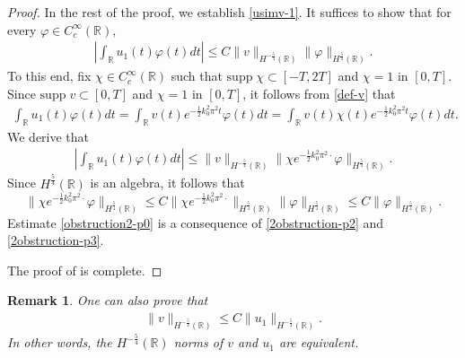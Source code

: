 \documentclass[11pt, reqno]{amsart}
\theoremstyle{plain}
\newtheorem{remark}{Remark}
\numberwithin{equation}{section}
\newcommand{\be}{\begin{equation}}
\newcommand{\ee}{\end{equation}}
\newcommand{\mR}{\mathbb{R}}
\begin{document}
\begin{proof}
In the rest of the proof,  we establish \eqref{usimv-1}. It suffices to show that for every $\varphi \in C_c^\infty(\mR)$,
\begin{align} \label{obstruction2-p0}
	\left| \int_{\mR} u_1(t) \varphi(t) dt \right| \leq C \|v \|_{H^{-\frac{5}{4}}(\mR)} \|\varphi \|_{H^{\frac{5}{4}}(\mR)}.
\end{align}
To this end, fix $\chi \in C^{\infty}_c(\mathbb{R})$ such that $\mathrm{supp} \; \chi \subset [-T, 2T]$ and $\chi = 1$ in $[0, T]$. Since $\mathrm{ supp } \; v \subset [0, T]$ and $\chi = 1$ in $[0, T]$, it follows from \eqref{def-v} that 
\begin{align*}
 \int_\mR u_1(t) \varphi(t)  dt = \int_\mR v(t) e^{-\frac{1}{2} k_0^2 \pi^2 t}   \varphi(t)  dt  
 = \int_\mR v(t) \chi(t) e^{-\frac{1}{2} k_0^2 \pi^2 t}   \varphi(t)  dt.
\end{align*}
We derive that 
\begin{align}	\label{2obstruction-p2}
	\left|\int_{\mathbb{R}} u_1(t) \varphi(t) dt \right| \leq  \|v\|_{H^{-\frac{5}{4}}(\mR)}\|\chi e^{-\frac{1}{2} k_0^2 \pi^2 \cdot} \varphi \|_{H^{\frac{5}{4}}(\mR)}.
\end{align}
Since $H^{\frac{5}{4}}(\mR)$ is an algebra, it follows that 
\be \label{2obstruction-p3}
 \|\chi e^{-\frac{1}{2} k_0^2 \pi^2 \cdot} \varphi \|_{H^{\frac{5}{4}}(\mR)} \le C \|\chi e^{-\frac{1}{2} k_0^2 \pi^2 \cdot} \|_{H^{\frac{5}{4}}(\mR)}\|\varphi \|_{H^{\frac{5}{4}}(\mR)}  \le C  \|\varphi \|_{H^{\frac{5}{4}}(\mR)}.
\ee
Estimate \eqref{obstruction2-p0} is a consequence of \eqref{2obstruction-p2} and \eqref{2obstruction-p3}. 

\medskip 
The proof of  is complete.
\end{proof}

\begin{remark} \rm One can also prove that  
\begin{align}
  \|v\|_{H^{-\frac{5}{4}}(\mathbb{R})} \leq C \|u_1 \|_{H^{-\frac{5}{4}}(\mathbb{R})}. 
\end{align}
In other words, the $H^{-\frac{5}{4}}(\mR)$ norms of $v$ and $u_1$ are equivalent. 
\end{remark}
\end{document}
